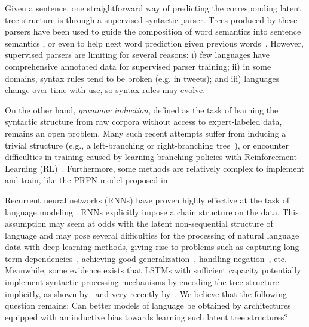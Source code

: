 \documentclass{article} \usepackage{iclr2019_conference,times}
\begin{document}
Given a sentence, one straightforward way of predicting the corresponding latent tree structure is through a supervised syntactic parser. 
Trees produced by these parsers have been used to guide the composition of word semantics into sentence semantics \citep{socher2013recursive,bowman2015tree}, or even to help next word prediction given previous words~\citep{wu2017sequence}.
However, supervised parsers are limiting for several reasons:
i) few languages have comprehensive annotated data for supervised parser training; 
ii) in some domains, syntax rules tend to be broken (e.g. in tweets); and
iii) languages change over time with use, so syntax rules may evolve.


On the other hand, \emph{grammar induction}, defined as the task of learning the syntactic structure from raw corpora without access to expert-labeled data, remains an open problem.
Many such recent attempts suffer from inducing a trivial structure (e.g., a left-branching or right-branching tree~\citep{williams2018latent}),
or encounter difficulties in training caused by learning branching policies with Reinforcement Learning (RL)~\citep{yogatama2016learning}.
Furthermore, some methods are relatively complex to implement and train, like the PRPN model proposed in~\cite{shen2017neural}.


Recurrent neural networks (RNNs) have proven highly effective at the task of language modeling \citep{merityRegOpt, melis2017state}.
RNNs explicitly impose a chain structure on the data.
This assumption may seem at odds with the latent non-sequential structure of language and may pose several difficulties for the processing of natural language data with deep learning methods, giving rise to problems such as capturing long-term dependencies~\citep{bengio2009learning}, achieving good generalization~\citep{bowman2015tree}, handling negation~\citep{socher2013recursive}, etc. Meanwhile, some evidence exists that LSTMs with sufficient capacity potentially implement
syntactic processing mechanisms by encoding the tree structure implicitly, as shown by~\cite{gulordava2018colorless,kuncoro2018lstms} and very recently by~\cite{lakretz2019emergence}.
We believe that the following question remains: Can better models of language be obtained by architectures equipped with an inductive bias towards learning such latent tree structures?
\end{document}
